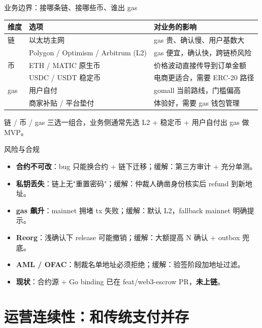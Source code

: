 \begin{frame}{业务边界：接哪条链、接哪些币、谁出 gas}
\begin{tabular}{@{}lll@{}}
\toprule
维度    & 选项                  & 对业务的影响 \\
\midrule
链       & 以太坊主网            & gas 贵、确认慢、用户基数大 \\
         & Polygon / Optimism / Arbitrum (L2) & gas 便宜，确认快，跨链桥风险 \\
币       & ETH / MATIC 原生币    & 价格波动直接传导到订单金额 \\
         & USDC / USDT 稳定币    & 电商更适合，需要 ERC-20 路径 \\
gas      & 用户自付              & gomall 当前路线，门槛偏高 \\
         & 商家补贴 / 平台垫付   & 体验好，需要 gas 钱包管理 \\
\bottomrule
\end{tabular}
\vspace{2mm}
\small 链 / 币 / gas 三选一组合，业务侧通常先选 L2 + 稳定币 + 用户自付出 gas 做 MVP。
\end{frame}

\begin{frame}{风险与合规}
\small
\begin{itemize}
  \item \textbf{合约不可改}：bug 只能换合约 + 链下迁移；缓解：第三方审计 + 充分单测。
  \item \textbf{私钥丢失}：链上无"重置密码"；缓解：仲裁人确凿身份核实后 refund 到新地址。
  \item \textbf{gas 飙升}：mainnet 拥堵 tx 失败；缓解：默认 L2，fallback mainnet 明确提示。
  \item \textbf{Reorg}：浅确认下 release 可能撤销；缓解：大额提高 N 确认 + outbox 兜底。
  \item \textbf{AML / OFAC}：制裁名单地址必须拒绝；缓解：验签阶段加地址过滤。
  \item \textbf{现状}：合约源 + Go binding 已在 feat/web3-escrow PR，\textbf{未上链}。
\end{itemize}
\end{frame}

\section{运营连续性：和传统支付并存}

